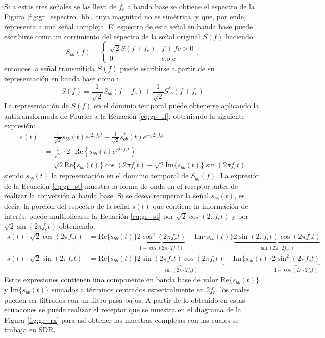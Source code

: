 Si a estas tres señales se las lleva de $f_c$ a banda base se obtiene el espectro de la Figura \ref{fig:gr_espectro_bb}, cuya magnitud no es simétrica, y que, por ende, representa a una señal compleja. El espectro de esta señal en banda base puede escribirse como un corrimiento del espectro de la señal original $S(f)$ haciendo:
\begin{equation}
    S_{bb}(f)=\left\{\begin{matrix}
        \sqrt{2} S(f+f_c) & f+fc>0         \\
        0                 & \textrm{c.o.c}
    \end{matrix}\right.,
\end{equation}
entonces la señal transmitida $S(f)$ puede escribirse a partir de su representación en banda base como \cite{bib:federico_larocca}:
\begin{equation}
    S(f)=\frac{1}{\sqrt{2}}S_{bb}(f-f_c) + \frac{1}{\sqrt{2}}S_{bb}^*(f+f_c)
    \label{eq:gr_sf}
\end{equation}
La representación de $S(f)$ en el dominio temporal puede obtenerse aplicando la antitransformada de Fourier a la Ecuación \ref{eq:gr_sf}, obteniendo la siguiente expresión:
\begin{align}
    s(t) & =\frac{1}{\sqrt{2}} s_{bb}(t) e^{j2\pi f_c t} + \frac{1}{\sqrt{2}}s_{bb}^*(t)  e^{-j2\pi f_c t}   \nonumber \\
         & = \frac{1}{\sqrt{2}} \cdot 2 \cdot \mathrm{Re}\left\{ s_{bb}(t) e^{j2\pi f_c t}\right\}      \nonumber      \\
         & = \sqrt{2} \mathrm{Re}\{s_{bb}(t) \}\cos(2\pi f_c t) - \sqrt{2} \mathrm{Im}\{s_{bb}(t) \}\sin(2\pi f_c t)
    \label{eq:gr_st}
\end{align}
siendo $s_{bb}(t)$ la representación en el dominio temporal de $S_{bb}(f)$. La expresión de la Ecuación \ref{eq:gr_st} muestra la forma de onda en el receptor antes de realizar la conversión a banda base. Si se desea recuperar la señal $s_{bb}(t)$, es decir, la porción del espectro de la señal $s(t)$ que contiene la información de interés, puede multiplicarse la Ecuación \ref{eq:gr_st} por $\sqrt{2}\cos(2\pi f_c t)$ y por $\sqrt{2}\sin(2\pi f_c t)$  obteniendo:
\begin{align}
    s(t)\cdot \sqrt{2} \cos(2\pi f_c t) & = \mathrm{Re}\{s_{bb}(t) \} \underbrace{2 \cos^2(2\pi f_c t)}_{1+\cos(2\pi\cdot 2f_c t)} - \mathrm{Im}\{s_{bb}(t) \}\underbrace{2\sin(2\pi f_c t) \cos(2\pi f_c t)}_{\sin(2\pi\cdot 2f_c t)} \\
    s(t)\cdot \sqrt{2} \sin(2\pi f_c t) & = \mathrm{Re}\{s_{bb}(t) \} \underbrace{2\sin(2\pi f_c t) \cos(2\pi f_c t)}_{\sin(2\pi\cdot 2f_c t)} - \mathrm{Im}\{s_{bb}(t) \}\underbrace{2\sin^2(2\pi f_c t)}_{1-\cos(2\pi\cdot 2f_c t)}
\end{align}
Estas expresiones contienen una componente en banda base de valor $\mathrm{Re}\{s_{bb}(t) \}$ y $\mathrm{Im}\{s_{bb}(t) \}$ sumados a términos centrados espectralmente en $2f_c$, los cuales pueden ser filtrados con un filtro pasa-bajos. A partir de lo obtenido en estas ecuaciones se puede realizar el receptor que se muestra en el diagrama de la Figura \ref{fig:gr_rx} para así obtener las muestras complejas con las cuales se trabaja en SDR.

